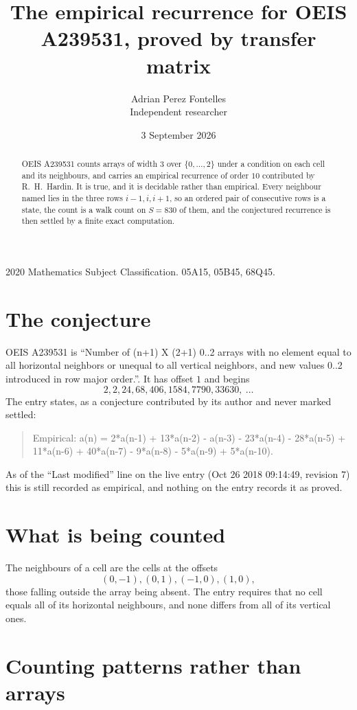 \documentclass[11pt,a4paper]{article}
\title{The empirical recurrence for OEIS A239531, proved by transfer matrix}
\author{Adrian Perez Fontelles\\ \small Independent researcher}
\date{3 September 2026}
\theoremstyle{plain}
\theoremstyle{definition}
\begin{document}
\maketitle

\begin{abstract}
OEIS A239531 counts arrays of width $3$ over $\{0,\dots,2\}$ under a condition on each cell
and its neighbours, and carries an empirical recurrence of order $10$ contributed by
R.~H.~Hardin. It is true, and it is decidable rather than empirical. Every neighbour named lies
in the three rows $i-1,i,i+1$, so an ordered pair of consecutive rows is a state, the count is
a walk count on $S=830$ of them, and the conjectured recurrence is then settled by a finite
exact computation.
\end{abstract}

\noindent\small 2020 Mathematics Subject Classification. 05A15, 05B45, 68Q45.\normalsize

\section{The conjecture}

OEIS A239531 is ``Number of (n+1) X (2+1) 0..2 arrays with no element equal to all horizontal neighbors or unequal to all vertical neighbors, and new values 0..2 introduced in row major order.''. It has offset $1$ and begins
\[
2, 2, 24, 68, 406, 1584, 7790, 33630,\ \dots
\]
The entry states, as a conjecture contributed by its author and never marked settled:
\begin{quote}
Empirical: a(n) = 2*a(n-1) + 13*a(n-2) - a(n-3) - 23*a(n-4) - 28*a(n-5) + 11*a(n-6) + 40*a(n-7) - 9*a(n-8) - 5*a(n-9) + 5*a(n-10).
\end{quote}
As of the ``Last modified'' line on the live entry (Oct 26 2018 09:14:49, revision 7) this is still
recorded as empirical, and nothing on the entry records it as proved.

\section{What is being counted}

The neighbours of a cell are the cells at the offsets
\[
(0,-1), (0,1), (-1,0), (1,0),
\]
those falling outside the array being absent. The entry requires that no cell equals all of its horizontal neighbours, and none differs from all of its vertical ones.

\section{Counting patterns rather than arrays}
\end{document}
